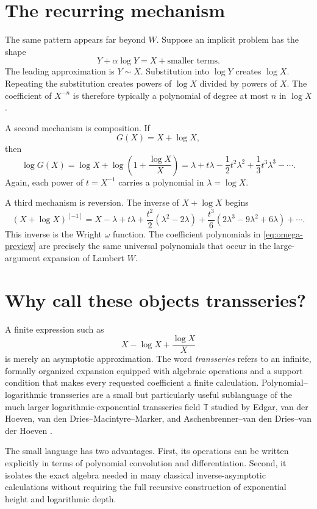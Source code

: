 \documentclass[11pt,openany]{book}
\theoremstyle{definition}
\theoremstyle{plain}
\theoremstyle{remark}
\newcommand{\T}{\mathbb{T}}
\newcommand{\invcomp}{^{[-1]}}
\begin{document}
\section{The recurring mechanism}
The same pattern appears far beyond \(W\). Suppose an implicit problem has the shape
\[
 Y+\alpha\log Y=X+\text{smaller terms}.
\]
The leading approximation is \(Y\sim X\). Substitution into \(\log Y\) creates \(\log X\). Repeating the substitution creates powers of \(\log X\) divided by powers of \(X\). The coefficient of \(X^{-n}\) is therefore typically a polynomial of degree at most \(n\) in \(\log X\).

A second mechanism is composition. If
\[
 G(X)=X+\log X,
\]
then
\[
 \log G(X)=\log X+\log\left(1+\frac{\log X}{X}\right)
 =\lambda+t\lambda-\frac12t^2\lambda^2+\frac13t^3\lambda^3-\cdots.
\]
Again, each power of \(t=X^{-1}\) carries a polynomial in \(\lambda=\log X\).

A third mechanism is reversion. The inverse of \(X+\log X\) begins
\begin{equation}\label{eq:omega-preview}
 (X+\log X)\invcomp
 =X-\lambda+t\lambda
 +\frac{t^2}{2}(\lambda^2-2\lambda)
 +\frac{t^3}{6}(2\lambda^3-9\lambda^2+6\lambda)+\cdots.
\end{equation}
This inverse is the Wright \(\omega\) function. The coefficient polynomials in \cref{eq:omega-preview} are precisely the same universal polynomials that occur in the large-argument expansion of Lambert \(W\).

\section{Why call these objects transseries?}
A finite expression such as
\[
 X-\log X+\frac{\log X}{X}
\]
is merely an asymptotic approximation. The word \emph{transseries} refers to an infinite, formally organized expansion equipped with algebraic operations and a support condition that makes every requested coefficient a finite calculation. Polynomial--logarithmic transseries are a small but particularly useful sublanguage of the much larger logarithmic-exponential transseries field \(\T\) studied by Edgar, van der Hoeven, van den Dries--Macintyre--Marker, and Aschenbrenner--van den Dries--van der Hoeven \cite{edgar-beginners,edgar-composition,vdDMM-1997,vdDMM-2001,vdhoeven-book,adh-book}.

The small language has two advantages. First, its operations can be written explicitly in terms of polynomial convolution and differentiation. Second, it isolates the exact algebra needed in many classical inverse-asymptotic calculations without requiring the full recursive construction of exponential height and logarithmic depth.
\end{document}
